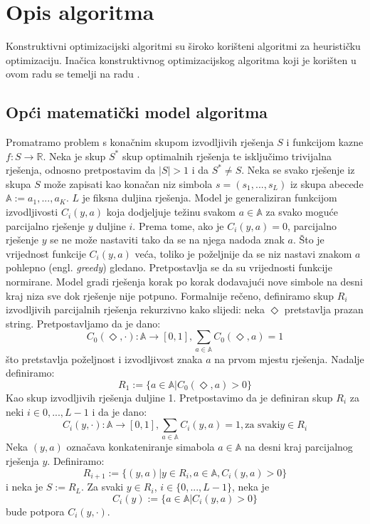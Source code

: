 \documentclass[times, utf8, zavrsni]{fer}
\begin{document}
\chapter{Opis algoritma}
\label{chap:opis_algoritma}
Konstruktivni optimizacijski algoritmi su široko korišteni algoritmi za heurističku optimizaciju. Inačica konstruktivnog optimizacijskog algoritma koji je korišten u ovom radu se temelji na radu \citep{zijun2014asymptotic}.

\section{Opći matematički model algoritma}
Promatramo problem s konačnim skupom izvodljivih rješenja $S$ i funkcijom kazne $f: S \rightarrow \mathbb{R}$. Neka je skup $S^*$ skup optimalnih rješenja te isključimo trivijalna rješenja,
odnosno pretpostavim da $|S| > 1$ i da $S^* \neq S$. Neka se svako rješenje iz skupa $S$ može zapisati kao konačan niz simbola
$s = (s_1,...,s_L)$ iz skupa abecede $\mathbb{A} := {a_1,..., a_K}$. $L$ je fiksna duljina rješenja. Model je generaliziran funkcijom izvodljivosti $C_i(y, a)$ koja dodjeljuje težinu svakom $a \in \mathbb{A}$ za svako moguće parcijalno
rješenje $y$ duljine $i$. Prema tome, ako je $C_i(y, a) = 0$, parcijalno rješenje $y$ se ne može nastaviti tako da se na njega nadoda znak $a$. Što je vrijednost funkcije $C_i(y, a)$ veća, toliko je poželjnije da se niz nastavi znakom $a$ pohlepno (engl. \textit{greedy}) gledano. Pretpostavlja se da su vrijednosti funkcije normirane. Model gradi rješenja korak po korak dodavajući nove simbole na desni kraj niza sve dok rješenje nije potpuno. Formalnije rečeno, definiramo skup $R_i$ izvodljivih parcijalnih rješenja rekurzivno kako slijedi:
neka $\Diamond$ pretstavlja prazan string. Pretpostavljamo da je dano:
$$
C_0(\Diamond, \cdot) :\mathbb{A} \rightarrow [0, 1],   \sum_{a \in \mathbb{A}} C_0(\Diamond, a) = 1
$$
što pretstavlja poželjnost i izvodljivost znaka $a$ na prvom mjestu rješenja. Nadalje definiramo:
$$
R_1 := \{ a \in \mathbb{A} | C_0(\Diamond, a) > 0 \}
$$
Kao skup izvodljivih rješenja duljine 1. Pretpostavimo da je definiran skup $R_i$ za neki $i \in {0,..., L - 1}$ i da je dano:
$$
C_i(y, \cdot) :\mathbb{A} \rightarrow [0, 1], \sum_{a \in \mathbb{A}} C_i(y, a) = 1, \text{za svaki} y \in R_i
$$
Neka $(y, a)$ označava konkateniranje simabola $a \in \mathbb{A}$ na desni kraj parcijalnog rješenja $y$. Definiramo:
$$
R_{i+1} := \{ (y, a) | y \in R_i, a \in \mathbb{A}, C_i(y, a) > 0 \}
$$
i neka je $S := R_L$. Za svaki $y \in R_i$, $i \in \{0,..., L-1\}$, neka je
$$
C_i(y) := \{ a \in \mathbb{A} | C_i(y, a) > 0 \}
$$
bude potpora $C_i(y, \cdot)$. %
\end{document}
